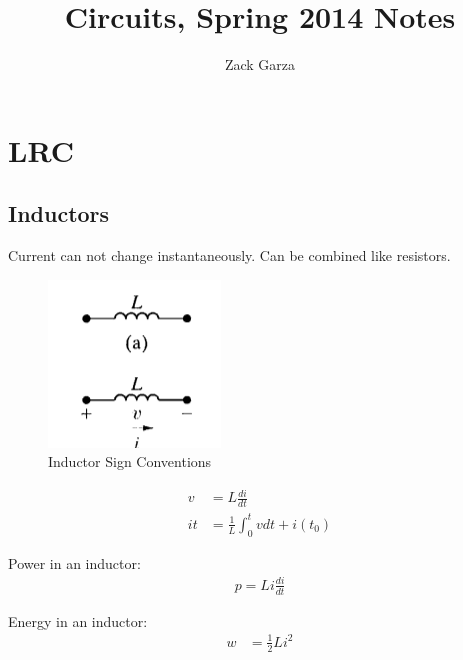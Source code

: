 \documentclass[a4paper,10pt]{report}
\begin{document}
\title{Circuits, Spring 2014 Notes}
\author{Zack Garza}
\maketitle
\tableofcontents

\chapter{LRC}
\section{Inductors}
Current can not change instantaneously.
Can be combined like resistors.

\begin{figure}[htpb]
	\begin{centering}
	\begin{center}
	\includegraphics{./inductor_sign_convention.png}
	\caption{Inductor Sign Conventions}
	\label{fig:inductor_sign_convention}
	\end{center}
	\par\end{centering}
\end{figure}

\begin{align*}
	v &= L \frac{di}{dt} \\
	i{t} &= \frac{1}{L} \int_0^t v dt + i(t_0)
\end{align*}

Power in an inductor:
\begin{align*}
	p = Li\frac{di}{dt}
\end{align*}

Energy in an inductor:
\begin{align*}
	w &= \frac{1}{2}Li^2
\end{align*}
\end{document}
